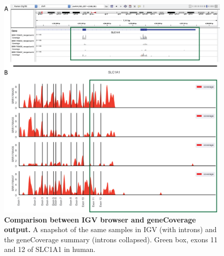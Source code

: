 \documentclass[10pt, oneside]{article}
\begin{document}
\begin{figure}
\centering
  \includegraphics[width=160mm]{figures/xpresspipe_supplement1.png}
  \caption{\textbf{Comparison between IGV browser and geneCoverage output.} A snapshot of the same samples in IGV (with introns) and the geneCoverage summary (introns collapsed). Green box, exons 11 and 12 of SLC1A1 in human.}
  \label{fig:supplement1}
\end{figure}
\end{document}
